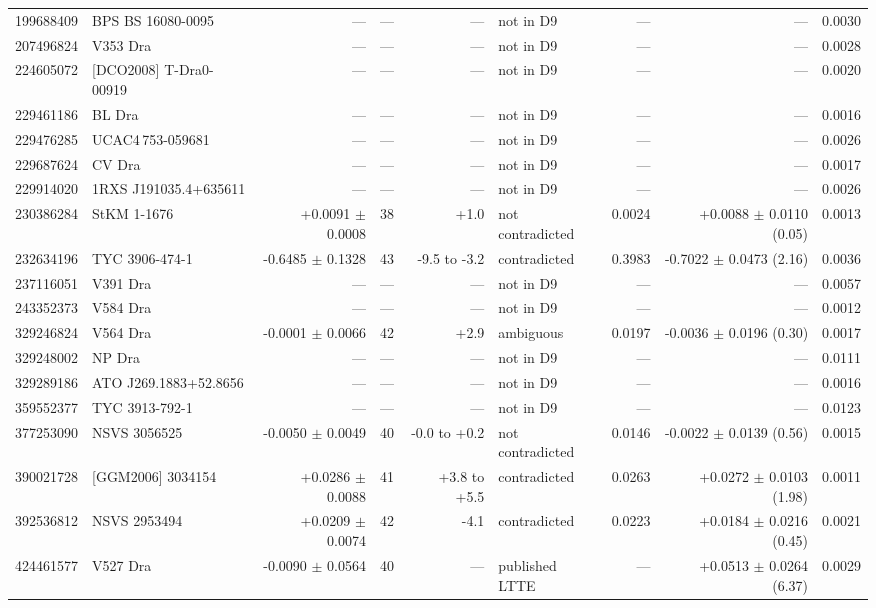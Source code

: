 \documentclass{aa}
\begin{document}
\begin{table}
\begin{tabular}{r l r r r l r r r}
199688409 & BPS BS 16080-0095 & --- & --- & --- & not in D9 & --- & --- & 0.0030\\
207496824 & V353 Dra & --- & --- & --- & not in D9 & --- & --- & 0.0028\\
224605072 & [DCO2008] T-Dra0-00919 & --- & --- & --- & not in D9 & --- & --- & 0.0020\\
229461186 & BL Dra & --- & --- & --- & not in D9 & --- & --- & 0.0016\\
229476285 & UCAC4\,753-059681 & --- & --- & --- & not in D9 & --- & --- & 0.0026\\
229687624 & CV Dra & --- & --- & --- & not in D9 & --- & --- & 0.0017\\
229914020 & 1RXS J191035.4+635611 & --- & --- & --- & not in D9 & --- & --- & 0.0026\\
230386284 & StKM 1-1676 & +0.0091 $\pm$ 0.0008 & 38 & +1.0 & not contradicted & 0.0024 & +0.0088 $\pm$ 0.0110 (0.05) & 0.0013\\
232634196 & TYC 3906-474-1 & -0.6485 $\pm$ 0.1328 & 43 & -9.5 to -3.2 & contradicted & 0.3983 & -0.7022 $\pm$ 0.0473 (2.16) & 0.0036\\
237116051 & V391 Dra & --- & --- & --- & not in D9 & --- & --- & 0.0057\\
243352373 & V584 Dra & --- & --- & --- & not in D9 & --- & --- & 0.0012\\
329246824 & V564 Dra & -0.0001 $\pm$ 0.0066 & 42 & +2.9 & ambiguous & 0.0197 & -0.0036 $\pm$ 0.0196 (0.30) & 0.0017\\
329248002 & NP Dra & --- & --- & --- & not in D9 & --- & --- & 0.0111\\
329289186 & ATO J269.1883+52.8656 & --- & --- & --- & not in D9 & --- & --- & 0.0016\\
359552377 & TYC 3913-792-1 & --- & --- & --- & not in D9 & --- & --- & 0.0123\\
377253090 & NSVS 3056525 & -0.0050 $\pm$ 0.0049 & 40 & -0.0 to +0.2 & not contradicted & 0.0146 & -0.0022 $\pm$ 0.0139 (0.56) & 0.0015\\
390021728 & [GGM2006] 3034154 & +0.0286 $\pm$ 0.0088 & 41 & +3.8 to +5.5 & contradicted & 0.0263 & +0.0272 $\pm$ 0.0103 (1.98) & 0.0011\\
392536812 & NSVS 2953494 & +0.0209 $\pm$ 0.0074 & 42 & -4.1 & contradicted & 0.0223 & +0.0184 $\pm$ 0.0216 (0.45) & 0.0021\\
424461577 & V527 Dra & -0.0090 $\pm$ 0.0564 & 40 & --- & published LTTE & --- & +0.0513 $\pm$ 0.0264 (6.37) & 0.0029\\
\hline
\end{tabular}
\end{table}
\end{document}
